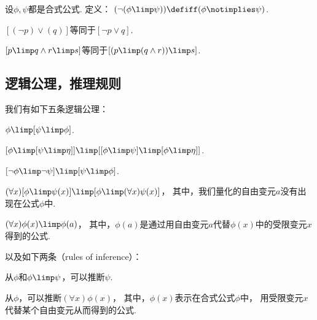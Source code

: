 \begin{definition}
设\(\phi,\psi\)都是合式公式.
定义：
\((\neg(\phi\limp\psi))
\defiff
(\phi\notimplies\psi)\).
\end{definition}

\begin{example}
\([(\neg p) \lor (q)]\)等同于\([\neg p \lor q]\).
\end{example}

\begin{example}
\([p \limp q \land r \limp s]\)等同于\([(p \limp (q \land r)) \limp s]\).
\end{example}

\subsection{逻辑公理，推理规则}
我们有如下五条逻辑公理：
\begin{axiom}
\(\phi \limp [\psi \limp \phi]\).
\end{axiom}
\begin{axiom}
\([\phi \limp [\psi \limp \eta]] \limp [[\phi \limp \psi] \limp [\phi \limp \eta]]\).
\end{axiom}
\begin{axiom}
\([\neg\phi \limp \neg\psi] \limp [\psi \limp \phi]\).
\end{axiom}
\begin{axiom}
\((\forall x)[\phi \limp \psi(x)] \limp [\phi \limp (\forall x) \psi(x)]\)，
其中，我们量化的自由变元\(a\)没有出现在公式\(\phi\)中.
\end{axiom}
\begin{axiom}
\((\forall x) \phi(x) \limp \phi(a)\)，
其中，\(\phi(a)\)是通过用自由变元\(a\)代替\(\phi(x)\)中的受限变元\(x\)得到的公式.
\end{axiom}
以及如下两条（rules of inference）：
\begin{axiom}
从\(\phi\)和\(\phi \limp \psi\)，可以推断\(\psi\).
\end{axiom}
\begin{axiom}
从\(\phi\)，可以推断\((\forall x) \phi(x)\)，
其中，\(\phi(x)\)表示在合式公式\(\phi\)中，
用受限变元\(x\)代替某个自由变元从而得到的公式.
\end{axiom}

